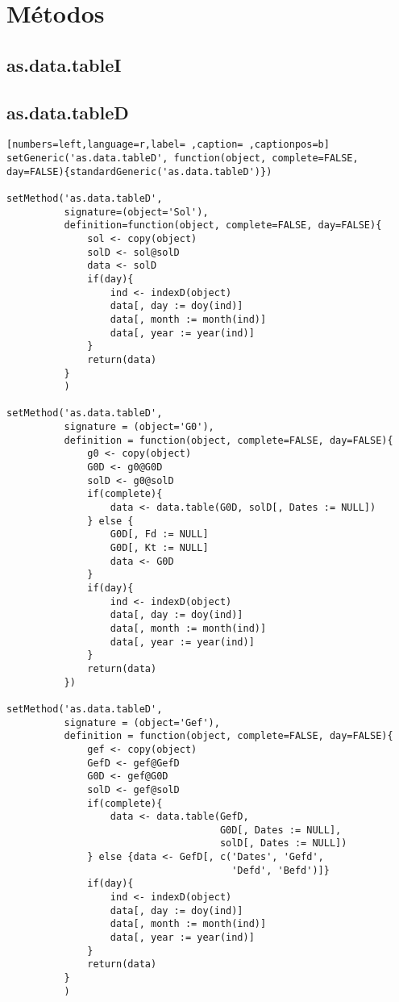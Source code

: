 \section{Métodos}
\label{sec:orgb59ad5a}
\subsection{as.data.tableI}
\label{sec:org95cd0f0}
\subsection{as.data.tableD}
\label{sec:org7b11f62}
\begin{lstlisting}[numbers=left,language=r,label= ,caption= ,captionpos=b]
setGeneric('as.data.tableD', function(object, complete=FALSE, day=FALSE){standardGeneric('as.data.tableD')})

setMethod('as.data.tableD',
          signature=(object='Sol'),
          definition=function(object, complete=FALSE, day=FALSE){
              sol <- copy(object)
              solD <- sol@solD
              data <- solD
              if(day){
                  ind <- indexD(object)
                  data[, day := doy(ind)]
                  data[, month := month(ind)]
                  data[, year := year(ind)]
              }
              return(data)
          }
          )

setMethod('as.data.tableD',
          signature = (object='G0'),
          definition = function(object, complete=FALSE, day=FALSE){
              g0 <- copy(object)
              G0D <- g0@G0D
              solD <- g0@solD
              if(complete){
                  data <- data.table(G0D, solD[, Dates := NULL])
              } else {
                  G0D[, Fd := NULL]
                  G0D[, Kt := NULL]
                  data <- G0D
              }
              if(day){
                  ind <- indexD(object)
                  data[, day := doy(ind)]
                  data[, month := month(ind)]
                  data[, year := year(ind)]
              }
              return(data)
          })

setMethod('as.data.tableD',
          signature = (object='Gef'),
          definition = function(object, complete=FALSE, day=FALSE){
              gef <- copy(object)
              GefD <- gef@GefD
              G0D <- gef@G0D
              solD <- gef@solD
              if(complete){
                  data <- data.table(GefD,
                                     G0D[, Dates := NULL],
                                     solD[, Dates := NULL])
              } else {data <- GefD[, c('Dates', 'Gefd',
                                       'Defd', 'Befd')]}
              if(day){
                  ind <- indexD(object)
                  data[, day := doy(ind)]
                  data[, month := month(ind)]
                  data[, year := year(ind)]     
              }
              return(data)
          }
          )


\end{lstlisting}
